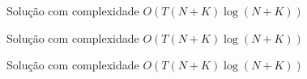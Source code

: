 \begin{frame}[fragile]{Solução com complexidade $O(T(N + K)\log(N + K))$}
\end{frame}

\begin{frame}[fragile]{Solução com complexidade $O(T(N + K)\log(N + K))$}
\end{frame}

\begin{frame}[fragile]{Solução com complexidade $O(T(N + K)\log(N + K))$}
\end{frame}
